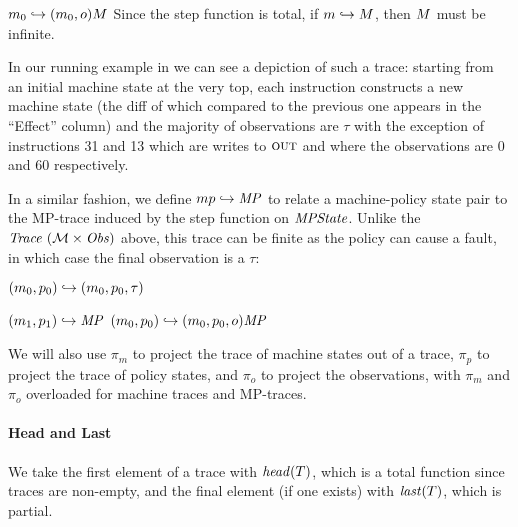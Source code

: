 \documentclass[acmsmall,review,anonymous]{acmart}\settopmatter{printfolios=true,printccs=false,printacmref=false}
\begin{document}
            {\(m_0 \hookrightarrow (m_0,o) M\)}%
%
\noindent
Since the step function is total, if \(m \hookrightarrow M\),
then \(M\) must be infinite.

In our running example in  we can
see a depiction of such a trace: starting from an initial machine
state at the very top, each instruction constructs a new machine state
(the diff of which compared to the previous one appears in the
``Effect'' column) and the majority of observations are $\tau$ with
the exception of instructions 31 and 13 which are writes to $\textsc{out}$
and where the observations are $0$ and $60$ respectively.

In a similar fashion, we define \(mp \hookrightarrow \mathit{MP}\)
to relate a machine-policy state pair to the MP-trace
induced by the step function on $\mathit{MPState}$. Unlike the $\mathit{Trace}~({\mathcal M} \times \mathit{Obs})$ above, this trace can
be finite as the policy can cause a fault, in which case the final observation is
a \(\tau\):

\begin{minipage}{.4\textwidth}
         {\((m_0,p_0) \hookrightarrow (m_0,p_0,\tau)\)}
\end{minipage}
\begin{minipage}{.55\textwidth}
              {\((m_1,p_1) \hookrightarrow \mathit{MP}\)}
              {\((m_0,p_0) \hookrightarrow
                 (m_0,p_0,o) \mathit{MP}\)}
\end{minipage}

We will also use \(\pi_m\) to project the trace of machine states
out of a trace, \(\pi_p\) to project the trace of policy states, and
\(\pi_o\) to project the observations, with \(\pi_m\) and \(\pi_o\) overloaded
for machine traces and MP-traces.

\paragraph*{Head and Last}

We take the first element of a trace with \(\mathit{head}(T)\), which is a total
function since traces are non-empty, and the final element (if one exists) with
\(\mathit{last}(T)\), which is partial.
\end{document}
